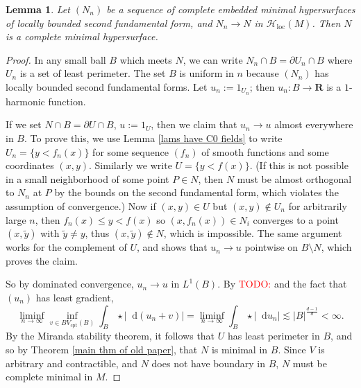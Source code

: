 \documentclass[reqno,11pt]{amsart}
\newcommand{\RR}{\mathbf{R}}
\newcommand*\dif{\mathop{}\!\mathrm{d}}
\newcommand{\Hypspace}{\mathscr H}
\newcommand{\loc}{\mathrm{loc}}
\newcommand{\cpt}{\mathrm{cpt}}
\newtheorem{lemma}[theorem]{Lemma}
\theoremstyle{definition}
\numberwithin{equation}{section}
\newcommand\todo[1]{\textcolor{red}{TODO: #1}}
\begin{document}
\begin{lemma}\label{limit of minimals is minimal}
Let $(N_n)$ be a sequence of complete embedded minimal hypersurfaces of locally bounded second fundamental form, and $N_n \to N$ in $\Hypspace_\loc(M)$.
Then $N$ is a complete minimal hypersurface.
\end{lemma}
\begin{proof}
In any small ball $B$ which meets $N$, we can write $N_n \cap B = \partial U_n \cap B$ where $U_n$ is a set of least perimeter.
The set $B$ is uniform in $n$ because $(N_n)$ has locally bounded second fundamental forms.
Let $u_n := 1_{U_n}$; then $u_n: B \to \RR$ is a $1$-harmonic function.

If we set $N \cap B = \partial U \cap B$, $u := 1_U$, then we claim that $u_n \to u$ almost everywhere in $B$.
To prove this, we use Lemma \ref{lams have C0 fields} to write $U_n = \{y < f_n(x)\}$ for some sequence $(f_n)$ of smooth functions and some coordinates $(x, y)$.
Similarly we write $U = \{y < f(x)\}$.
(If this is not possible in a small neighborhood of some point $P \in N$, then $N$ must be almost orthogonal to $N_n$ at $P$ by the bounds on the second fundamental form, which violates the assumption of convergence.)
Now if $(x, y) \in U$ but $(x, y) \notin U_n$ for arbitrarily large $n$, then $f_n(x) \leq y < f(x)$ so $(x, f_n(x)) \in N_i$ converges to a point $(x, \tilde y)$ with $\tilde y \neq y$, thus $(x, \tilde y) \notin N$, which is impossible.
The same argument works for the complement of $U$, and shows that $u_n \to u$ pointwise on $B \setminus N$, which proves the claim.

So by dominated convergence, $u_n \to u$ in $L^1(B)$.
By \todo{\cite{BackusFLG}} and the fact that $(u_n)$ has least gradient,
$$\liminf_{n \to \infty} \inf_{v \in BV_\cpt(B)} \int_B \star |\dif (u_n + v)| = \liminf_{n \to \infty} \int_B \star |\dif u_n| \lesssim |B|^{\frac{d - 1}{d}} < \infty.$$
By the Miranda stability theorem, it follows that $U$ has least perimeter in $B$, and so by Theorem \ref{main thm of old paper}, that $N$ is minimal in $B$.
Since $V$ is arbitrary and contractible, and $N$ does not have boundary in $B$, $N$ must be complete minimal in $M$.
\end{proof}
\end{document}
